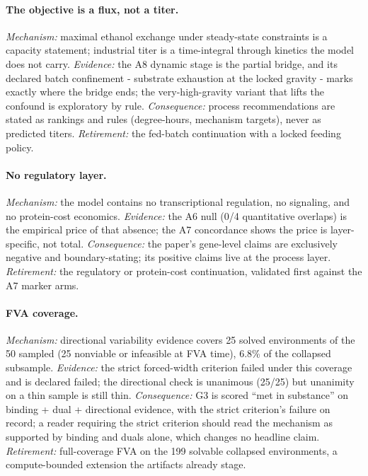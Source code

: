 \documentclass[12pt]{article}
\begin{document}
\paragraph{The objective is a flux, not a titer.} \emph{Mechanism:}
maximal ethanol exchange under steady-state constraints is a capacity
statement; industrial titer is a time-integral through kinetics the
model does not carry. \emph{Evidence:} the A8 dynamic stage is the
partial bridge, and its declared batch confinement - substrate
exhaustion at the locked gravity - marks exactly where the bridge
ends; the very-high-gravity variant that lifts the confound is
exploratory by rule. \emph{Consequence:} process recommendations are
stated as rankings and rules (degree-hours, mechanism targets), never
as predicted titers. \emph{Retirement:} the fed-batch continuation
with a locked feeding policy.

\paragraph{No regulatory layer.} \emph{Mechanism:} the model contains
no transcriptional regulation, no signaling, and no protein-cost
economics. \emph{Evidence:} the A6 null (0/4 quantitative overlaps)
is the empirical price of that absence; the A7 concordance shows the
price is layer-specific, not total. \emph{Consequence:} the paper's
gene-level claims are exclusively negative and boundary-stating; its
positive claims live at the process layer. \emph{Retirement:} the
regulatory or protein-cost continuation, validated first against the
A7 marker arms.

\paragraph{FVA coverage.} \emph{Mechanism:} directional variability
evidence covers 25 solved environments of the 50 sampled (25
nonviable or infeasible at FVA time), 6.8\% of the collapsed
subsample. \emph{Evidence:} the strict forced-width criterion failed
under this coverage and is declared failed; the directional check is
unanimous (25/25) but unanimity on a thin sample is still thin.
\emph{Consequence:} G3 is scored ``met in substance'' on binding +
dual + directional evidence, with the strict criterion's failure on
record; a reader requiring the strict criterion should read the
mechanism as supported by binding and duals alone, which changes no
headline claim. \emph{Retirement:} full-coverage FVA on the 199
solvable collapsed environments, a compute-bounded extension the
artifacts already stage.
\end{document}
